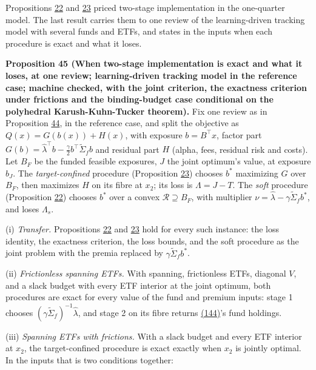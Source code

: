 \documentclass[11pt]{article}
\begin{document}
Propositions \hyperref[res:Proposition-22]{22} and \hyperref[res:Proposition-23]{23} priced two-stage implementation in the
one-quarter model. The last result carries them to one review of the
learning-driven tracking model with several funds and ETFs, and states
in the inputs when each procedure is exact and what it loses.

\label{res:Proposition-45}
\textbf{Proposition 45 (When two-stage implementation is exact and what it loses, at one review; learning-driven tracking model in the reference case; machine checked, with the joint criterion, the exactness criterion under frictions and the binding-budget case conditional on the polyhedral Karush-Kuhn-Tucker theorem).}
Fix one review as in Proposition \hyperref[res:Proposition-44]{44}, in the reference case, and split
the objective as \(Q(x)=G(b(x))+H(x)\), with exposure \(b=B^\top x\), factor part
\(G(b)=\hat\lambda^\top b-\frac\gamma2b^\top\tilde\Sigma_fb\) and residual part \(H\) (alpha, fees,
residual risk and costs). Let \(B_F\) be the funded feasible exposures,
\(J\) the joint optimum's value, at exposure \(b_J\). The \emph{target-confined}
procedure (Proposition \hyperref[res:Proposition-23]{23}) chooses \(b^*\) maximizing \(G\) over \(B_F\), then
maximizes \(H\) on its fibre at \(x_2\); its loss is \(\Lambda=J-T\). The \emph{soft}
procedure (Proposition \hyperref[res:Proposition-22]{22}) chooses \(b^*\) over a convex \(\mathcal R\supseteq B_F\),
with multiplier \(\nu=\hat\lambda-\gamma\tilde\Sigma_fb^*\), and loses \(\Lambda_s\).

(i) \emph{Transfer.} Propositions \hyperref[res:Proposition-22]{22} and \hyperref[res:Proposition-23]{23} hold for every such instance:
the loss identity, the exactness criterion, the loss bounds, and the
soft procedure as the joint problem with the premia replaced by
\(\gamma\tilde\Sigma_fb^*\).

(ii) \emph{Frictionless spanning ETFs.} With spanning, frictionless ETFs,
diagonal \(V\), and a slack budget with every ETF interior at the joint
optimum, both procedures are exact for every value of the fund and
premium inputs: stage 1 chooses \((\gamma\tilde\Sigma_f)^{-1}\hat\lambda\), and stage 2 on
its fibre returns \hyperref[eq:144]{(144)}'s fund holdings.

(iii) \emph{Spanning ETFs with frictions.} With a slack budget and every ETF
interior at \(x_2\), the target-confined procedure is exact exactly when
\(x_2\) is jointly optimal. In the inputs that is two conditions
together:
\end{document}
